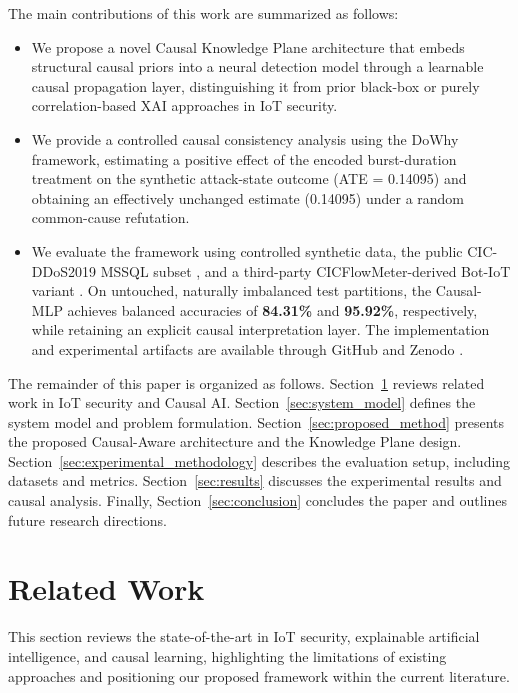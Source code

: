 \documentclass[journal]{IEEEtran}
\begin{document}
The main contributions of this work are summarized as follows:
\begin{itemize}
  \item We propose a novel Causal Knowledge Plane architecture
    that embeds structural causal priors into a neural detection
    model through a learnable causal propagation layer, distinguishing
    it from prior black-box or purely correlation-based XAI approaches
    in IoT security.
  \item We provide a controlled causal consistency analysis using the DoWhy framework, estimating a positive effect of the encoded burst-duration treatment on the synthetic attack-state outcome (ATE = 0.14095) and obtaining an effectively unchanged estimate (0.14095) under a random common-cause refutation.
  \item We evaluate the framework using controlled synthetic data, the public
    CIC-DDoS2019 MSSQL subset \cite{sharafaldin2019cicddos}, and a
    third-party CICFlowMeter-derived Bot-IoT variant
    \cite{koroniotis2019botiot,dhooge2026cicbotiot}. On untouched,
    naturally imbalanced test partitions, the Causal-MLP achieves balanced
    accuracies of \textbf{84.31\%} and \textbf{95.92\%}, respectively,
    while retaining an explicit causal interpretation layer.
    The implementation and experimental artifacts are available through
    GitHub and Zenodo
    \cite{our_github_repository,our_zenodo_archive}.
\end{itemize}

The remainder of this paper is organized as follows. Section~\ref{sec:related} reviews related work in IoT security and Causal AI. Section~\ref{sec:system_model} defines the system model and problem formulation. Section~\ref{sec:proposed_method} presents the proposed Causal-Aware architecture and the Knowledge Plane design. Section~\ref{sec:experimental_methodology} describes the evaluation setup, including datasets and metrics. Section~\ref{sec:results} discusses the experimental results and causal analysis. Finally, Section~\ref{sec:conclusion} concludes the paper and outlines future research directions.

\section{Related Work}
\label{sec:related}

This section reviews the state-of-the-art in IoT security, explainable artificial intelligence, and causal learning, highlighting the limitations of existing approaches and positioning our proposed framework within the current literature.
\end{document}
